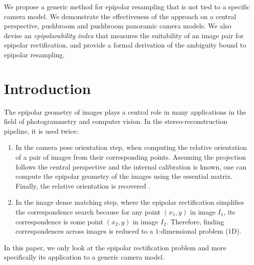 \documentclass{ipol}
\begin{document}
\begin{ipolAbstract}
We propose a generic method for epipolar resampling that is not tied to a specific camera model. We demonstrate the effectiveness of the approach on a central perspective, pushbroom and pushbroom panoramic camera models. We also devise an \textit{epipolarability index} that measures the suitability of an image pair for epipolar rectification, and provide a formal derivation of the ambiguity bound to epipolar resampling. 
\end{ipolAbstract}




\section{Introduction}
The epipolar geometry of images plays a central role in many applications in the field of photogrammetry and computer vision. In the stereo-reconstruction pipeline, it is used twice:

\begin{enumerate}
   \item In the camera pose orientation step, when computing the
      relative orientation of a pair of images from their corresponding points. Assuming 
      the projection follows the central perspective and the internal calibration is known,
      one can compute the epipolar geometry of the images using the essential matrix. Finally, the relative orientation is recovered \cite{fusiello2000epi}.   
     
   \item In the image dense matching step, where the epipolar rectification simplifies the 
       correspondence search because for any point $(x_1,y)$ in image $I_1$, its correspondence is some point $(x_2,y)$ in image $I_2$. Therefore, finding correspondences across images is reduced to 
        a $1$-dimensional problem ($1$D).
\end{enumerate}

\noindent In this paper, we only look at the epipolar rectification problem and more specifically
its application to a generic camera model.%
\end{document}
